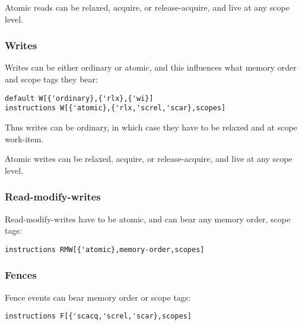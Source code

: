 Atomic reads can be relaxed, acquire, or release-acquire, and live at any scope
level. %

\subsubsection{Writes}

Writes can be either ordinary or atomic, and this influences what memory order
and scope tags they bear:
\begin{verbatim}
default W[{'ordinary},{'rlx},{'wi}]
instructions W[{'atomic},{'rlx,'screl,'scar},scopes]
\end{verbatim}

Thus writes can be ordinary, in which case they have to be relaxed and at scope
work-item. %

Atomic writes can be relaxed, acquire, or release-acquire, and live at any scope
level. %

\subsubsection{Read-modify-writes}

Read-modify-writes have to be atomic, and can bear any memory order, scope
tags:
\begin{verbatim}
instructions RMW[{'atomic},memory-order,scopes]
\end{verbatim}

\subsubsection{Fences}

Fence events can bear memory order or scope tags:
\begin{verbatim}
instructions F[{'scacq,'screl,'scar},scopes]
\end{verbatim}

